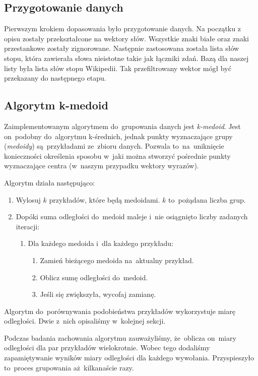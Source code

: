 \documentclass[a4paper,12pt]{mwart}
\begin{document}
\subsection{Przygotowanie danych}
Pierwszym krokiem dopasowania było przygotowanie danych. Na początku z opisu
zostały przekształcone na wektory słów. Wszystkie znaki białe oraz znaki
przestankowe zostały zignorowane. Następnie zastosowana została lista słów stopu,
która zawierała słowa nieistotne takie jak łączniki zdań. Bazą dla naszej listy
była lista słów stopu Wikipedii. Tak przefiltrowany wektor mógł być przekazany
do następnego etapu.

\subsection{Algorytm k-medoid}

Zaimplementowanym algorytmem do~grupowania danych jest \emph{k-medoid}. Jest
on~podobny do~algorytmu k-średnich, jednak punkty wyznaczające grupy
(\emph{medoidy}) są~przykładami ze~zbioru danych. Pozwala to~na~uniknięcie
konieczności określenia sposobu w~jaki można stworzyć pośrednie punkty
wyznaczające centra (w~naszym przypadku wektory wyrazów).

Algorytm działa następująco:

\begin{enumerate}
\item Wylosuj $k$ przykładów, które będą medoidami. $k$ to~pożądana liczba
  grup.
\item Dopóki suma odległości do~medoid maleje i~nie osiągnięto liczby
  zadanych iteracji:
\begin{enumerate}[label*=\arabic*.]
\item Dla każdego medoida i~dla każdego przykładu:
\begin{enumerate}[label*=\arabic*.]
\item Zamień bieżącego medoida na~aktualny przykład.
\item Oblicz sumę odległości do~medoid.
\item Jeśli się zwiększyła, wycofaj zamianę.
\end{enumerate}
\end{enumerate}
\end{enumerate}

Algorytm do~porównywania podobieństwa przykładów wykorzystuje miarę odległości.
Dwie z~nich opisaliśmy w~kolejnej sekcji.

Podczas badania zachowania algorytmu zauważyliśmy, że~oblicza on~miary
odległości dla par przykładów wielokrotnie. Wobec tego dodaliśmy zapamiętywanie
wyników miary odległości dla każdego wywołania. Przyspieszyło to~proces
grupowania aż~kilkanaście razy.
\end{document}
